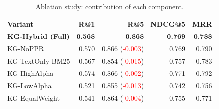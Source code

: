 \begin{table}[t]
\centering
\caption{Ablation study: contribution of each component.}
\label{tab:ablation}
\begin{tabular}{lrrrr}
\toprule
Variant & R@1 & R@5 & NDCG@5 & MRR \\
\midrule
\textbf{KG-Hybrid (Full)} & \textbf{0.568} & \textbf{0.868} & \textbf{0.769} & \textbf{0.788} \\
KG-NoPPR & 0.570 & 0.866 (\textcolor{red}{-0.003}) & 0.769 & 0.790 \\
KG-TextOnly-BM25 & 0.567 & 0.854 (\textcolor{red}{-0.015}) & 0.757 & 0.783 \\
KG-HighAlpha & 0.574 & 0.866 (\textcolor{red}{-0.002}) & 0.771 & 0.792 \\
KG-LowAlpha & 0.521 & 0.855 (\textcolor{red}{-0.013}) & 0.742 & 0.756 \\
KG-EqualWeight & 0.541 & 0.864 (\textcolor{red}{-0.004}) & 0.755 & 0.771 \\
\bottomrule
\end{tabular}
\end{table}